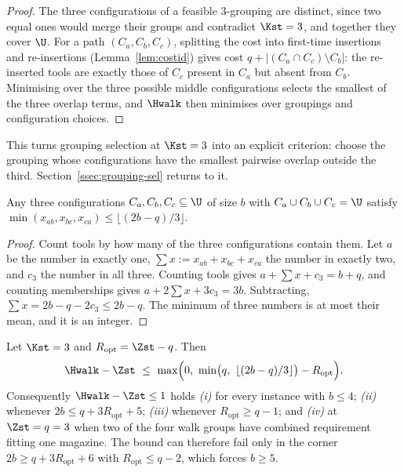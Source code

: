 \begin{proof}
The three configurations of a feasible $3$-grouping are distinct, since two equal
ones would merge their groups and contradict $\Kst=3$, and together they cover $\U$.
For a path $(C_a,C_b,C_c)$, splitting the cost into first-time insertions and
re-insertions (Lemma~\ref{lem:costid}) gives cost
$q+\lvert(C_a\cap C_c)\setminus C_b\rvert$: the re-inserted tools are exactly those
of $C_c$ present in $C_a$ but absent from $C_b$. Minimising over the three possible
middle configurations selects the smallest of the three overlap terms, and $\Hwalk$
then minimises over groupings and configuration choices.
\end{proof}

This turns grouping selection at $\Kst=3$ into an explicit criterion: choose the
grouping whose configurations have the smallest pairwise overlap outside the third.
Section~\ref{ssec:grouping-sel} returns to it.

\begin{lemma}\label{lem:overlap}
Any three configurations $C_a,C_b,C_c\subseteq\U$ of size $b$ with
$C_a\cup C_b\cup C_c=\U$ satisfy
$\min(x_{ab},x_{bc},x_{ca})\le\lfloor(2b-q)/3\rfloor$.
\end{lemma}

\begin{proof}
Count tools by how many of the three configurations contain them. Let $a$ be the
number in exactly one, $\sum x:=x_{ab}+x_{bc}+x_{ca}$ the number in exactly two, and
$c_3$ the number in all three. Counting tools gives $a+\sum x+c_3=b+q$, and counting
memberships gives $a+2\sum x+3c_3=3b$. Subtracting, $\sum x=2b-q-2c_3\le2b-q$. The
minimum of three numbers is at most their mean, and it is an integer.
\end{proof}

\begin{proposition}[The walk gap at $\Kst=3$]\label{prop:k3}
Let $\Kst=3$ and $R_{\mathrm{opt}}=\Zst-q$. Then
\[
  \Hwalk-\Zst\ \le\ \max\Bigl(0,\ \min\bigl(q,\ \lfloor(2b-q)/3\rfloor\bigr)
  -R_{\mathrm{opt}}\Bigr).
\]
Consequently $\Hwalk-\Zst\le1$ holds
\emph{(i)} for every instance with $b\le4$;
\emph{(ii)} whenever $2b\le q+3R_{\mathrm{opt}}+5$;
\emph{(iii)} whenever $R_{\mathrm{opt}}\ge q-1$; and
\emph{(iv)} at $\Zst=q=3$ when two of the four walk groups have combined requirement
fitting one magazine.
The bound can therefore fail only in the corner
$2b\ge q+3R_{\mathrm{opt}}+6$ with $R_{\mathrm{opt}}\le q-2$, which forces $b\ge5$.
\end{proposition}

